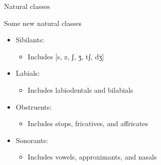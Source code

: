 \documentclass{beamer}
\newcommand{\subonetwo}{Natural classes}
\begin{document}
\begin{frame}[t]{\subonetwo}
{\begin{block}{Some new natural classes}
\begin{itemize}
              \item \alert{Sibilants}: 
              \begin{itemize}
                \item Includes [s, z, ʃ, ʒ, tʃ, dʒ]
              \end{itemize}
              \item<9-> \alert{Labials}: 
              \begin{itemize}
                \item Includes labiodentals and bilabials
              \end{itemize}
              \item<10-> \alert{Obstruents}: 
              \begin{itemize}
                \item Includes stops, fricatives, and affricates
              \end{itemize}
              \item<11-> \alert{Sonorants}: 
              \begin{itemize}
                \item Includes vowels, approximants, and nasals
              \end{itemize}
            \end{itemize}
          \end{block}
        }
      \end{frame}
\end{document}
